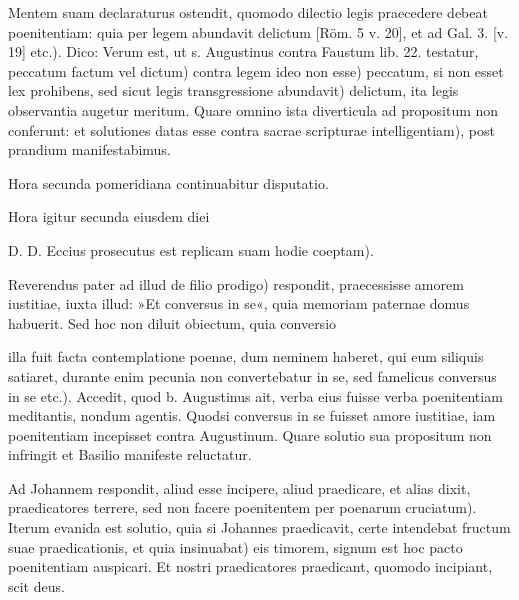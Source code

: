 Mentem suam declaraturus ostendit, quomodo dilectio legis praecedere debeat poenitentiam: quia per legem abundavit delictum [Röm. 5 v. 20], et ad Gal. 3. [v. 19] etc.). Dico: Verum est, ut s. Augustinus contra Faustum lib. 22. testatur, peccatum factum vel dictum) contra legem ideo non esse) peccatum, si non esset lex prohibens, sed sicut legis transgressione abundavit) delictum, ita legis observantia augetur meritum. Quare omnino ista diverticula ad propositum non conferunt: et solutiones datas esse contra sacrae scripturae intelligentiam), post prandium manifestabimus.

Hora secunda pomeridiana continuabitur disputatio.

Hora igitur secunda eiusdem diei

D. D. Eccius prosecutus est replicam suam hodie coeptam).

Reverendus pater ad illud de filio prodigo) respondit, praecessisse amorem iustitiae, iuxta illud: »Et conversus in se«, quia memoriam paternae domus habuerit. Sed hoc non diluit obiectum, quia conversio

illa fuit facta contemplatione poenae, dum neminem haberet, qui eum siliquis satiaret, durante enim pecunia non convertebatur in se, sed famelicus conversus in se etc.). Accedit, quod b. Augustinus ait, verba eius fuisse verba poenitentiam meditantis, nondum agentis. Quodsi conversus in se fuisset amore iustitiae, iam poenitentiam incepisset contra Augustinum. Quare solutio sua propositum non infringit et Basilio manifeste reluctatur.

Ad Johannem respondit, aliud esse incipere, aliud praedicare, et alias dixit, praedicatores terrere, sed non facere poenitentem per poenarum cruciatum). Iterum evanida est solutio, quia si Johannes praedicavit, certe intendebat fructum suae praedicationis, et quia insinuabat) eis timorem, signum est hoc pacto poenitentiam auspicari. Et nostri praedicatores praedicant, quomodo incipiant, scit deus.

